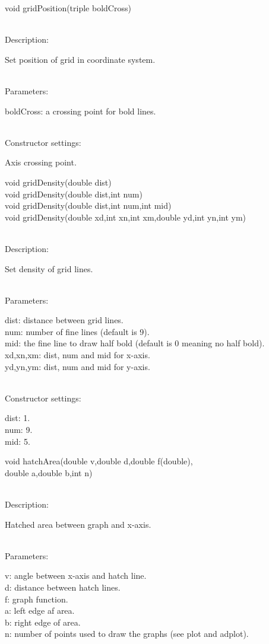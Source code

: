 \documentclass[12pt,a4paper]{article}
\newcommand{\memberitem}[1]{
                              \vspace{-0.5pc}
                              \end{minipage}\\
                              \phantom{M}#1:\\
                              \phantom{MM}
                              \begin{minipage}[t]{12cm}

                           }
\newcommand{\memdsc}{\memberitem{Description}}
\newcommand{\meminp}{\memberitem{Parameters}}
\newcommand{\memdef}{\memberitem{Constructor settings}}
\newenvironment{MemberDescr}
  {
    \begin{minipage}{15cm}
    \bf
  }
  {
    \end{minipage}
  }
\begin{document}
  \begin{MemberDescr}
    void gridPosition(triple boldCross)\\
    \memdsc
      Set position of grid in coordinate system.\\
    \meminp
      boldCross: a crossing point for bold lines.\\
    \memdef
      Axis crossing point.\\
  \end{MemberDescr}

  \begin{MemberDescr}
    void gridDensity(double dist)\\
    void gridDensity(double dist,int num)\\
    void gridDensity(double dist,int num,int mid)\\
    void gridDensity(double xd,int xn,int xm,double yd,int yn,int ym)\\
    \memdsc
      Set density of grid lines.\\
    \meminp
      dist: distance between grid lines.\\
      num:  number of fine lines (default is 9).\\
      mid:  the fine line to draw half bold (default is 0 meaning no half bold).\\
      xd,xn,xm: dist, num and mid for x-axis.\\
      yd,yn,ym: dist, num and mid for y-axis.\\
    \memdef
      dist: 1.\\
      num:  9.\\
      mid:  5.\\
  \end{MemberDescr}

  \begin{MemberDescr}
    void hatchArea(double v,double d,double f(double),\\
    \phantom{void hatchArea(}double a,double b,int n)\\
    \memdsc
      Hatched area between graph and x-axis.\\
    \meminp
      v: angle between x-axis and hatch line.\\
      d: distance between hatch lines.\\
      f: graph function.\\
      a: left edge af area.\\
      b: right edge of area.\\
      n: number of points used to draw the graphs (see plot and adplot).\\
  \end{MemberDescr}
\end{document}
